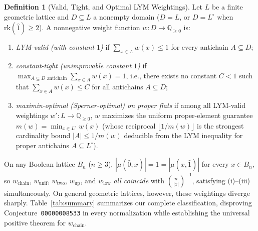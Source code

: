 \documentclass[11pt]{article}
\theoremstyle{definition}
\newtheorem{definition}[theorem]{Definition}
\theoremstyle{remark}
\newcommand{\rk}{\mathrm{rk}}
\begin{document}
\begin{definition}[Valid, Tight, and Optimal LYM Weightings]\label{def:optimal-lym}
Let $L$ be a finite geometric lattice and $D \subseteq L$ a nonempty domain ($D = L$, or $D = L^\circ$ when $\rk(\hat{1}) \ge 2$). A nonnegative weight function $w : D \to \mathbb{Q}_{\ge 0}$ is:
\begin{enumerate}
\item[(i)] \emph{LYM-valid (with constant $1$)} if $\sum_{x \in A} w(x) \le 1$ for every antichain $A \subseteq D$;
\item[(ii)] \emph{constant-tight (unimprovable constant $1$)} if $\max_{A \subseteq D\text{ antichain}} \sum_{x \in A} w(x) = 1$, i.e., there exists no constant $C < 1$ such that $\sum_{x \in A} w(x) \le C$ for all antichains $A \subseteq D$;
\item[(iii)] \emph{maximin-optimal (Sperner-optimal) on proper flats} if among all LYM-valid weightings $w' : L \to \mathbb{Q}_{\ge 0}$, $w$ maximizes the uniform proper-element guarantee $m(w) = \min_{x \in L^\circ} w(x)$ (whose reciprocal $\lfloor 1/m(w) \rfloor$ is the strongest cardinality bound $|A| \le 1/m(w)$ deducible from the LYM inequality for proper antichains $A \subseteq L^\circ$).
\end{enumerate}
\end{definition}

On any Boolean lattice $B_n$ ($n \ge 3$), $|\mu(\hat{0}, x)| = 1 = |\mu(x, \hat{1})|$ for every $x \in B_n$, so $w_{\mathrm{chain}}$, $w_{\mathrm{unif}}$, $w_{\mathrm{two}}$, $w_{\mathrm{up}}$, and $w_{\mathrm{low}}$ \emph{all coincide} with $\binom{n}{|x|}^{-1}$, satisfying (i)--(iii) simultaneously. On general geometric lattices, however, these weightings diverge sharply. Table~\ref{tab:summary} summarizes our complete classification, disproving Conjecture~\texttt{00000008533} in every normalization while establishing the universal positive theorem for $w_{\mathrm{chain}}$.
\end{document}
